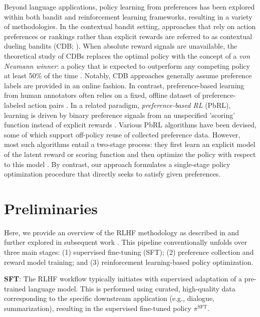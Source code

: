 Beyond language applications, policy learning from preferences has been explored within both bandit and reinforcement learning frameworks, resulting in a variety of methodologies. In the contextual bandit setting, approaches that rely on action preferences or rankings rather than explicit rewards are referred to as contextual dueling bandits (CDB; \cite{yue2012karmed,dudik2015contextual}). When absolute reward signals are unavailable, the theoretical study of CDBs replaces the optimal policy with the concept of a \textit{von Neumann winner}: a policy that is expected to outperform any competing policy at least 50\% of the time \citep{dudik2015contextual}. Notably, CDB approaches generally assume preference labels are provided in an online fashion. In contrast, preference-based learning from human annotators often relies on a fixed, offline dataset of preference-labeled action pairs \citep{yan2022human}. In a related paradigm, \textit{preference-based RL} (PbRL), learning is driven by binary preference signals from an unspecified 'scoring' function instead of explicit rewards \citep{BusaFekete2014,ruiz2023dueling}. Various PbRL algorithms have been devised, some of which support off-policy reuse of collected preference data. However, most such algorithms entail a two-stage process: they first learn an explicit model of the latent reward or scoring function and then optimize the policy with respect to this model \citep{jain2013learning,BusaFekete2014,christiano2017deep,sadigh2017active,kupcsik2018learning}. By contrast, our approach formulates a single-stage policy optimization procedure that directly seeks to satisfy given preferences.

\section{Preliminaries}\label{section:prelims}

Here, we provide an overview of the RLHF methodology as described in \citeauthor{ziegler2020finetuning} and further explored in subsequent work \citep{stiennon2022learning, bai2022training, ouyang2022training}. This pipeline conventionally unfolds over three main stages: (1) supervised fine-tuning (SFT); (2) preference collection and reward model training; and (3) reinforcement learning-based policy optimization.

\textbf{SFT}: The RLHF workflow typically initiates with supervised adaptation of a pre-trained language model. This is performed using curated, high-quality data corresponding to the specific downstream application (e.g., dialogue, summarization), resulting in the supervised fine-tuned policy $\pi^\text{SFT}$.

